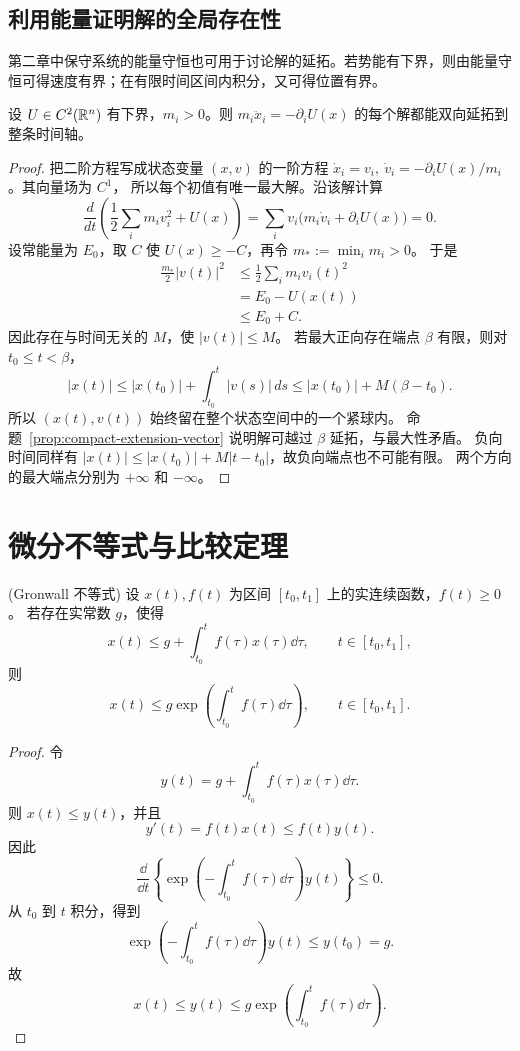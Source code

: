 \subsection*{利用能量证明解的全局存在性}
第二章中保守系统的能量守恒也可用于讨论解的延拓。若势能有下界，则由能量守恒可得速度有界；在有限时间区间内积分，又可得位置有界。
\begin{theorem}[能量与全局延拓]\label{thm:energy-global-extension}
设 $U\in C^2(\mathbb{R}^n)$ 有下界，$m_i>0$。则
$m_i\ddot x_i=-\partial_iU(x)$ 的每个解都能双向延拓到整条时间轴。
\end{theorem}
\begin{proof}
把二阶方程写成状态变量 $(x,v)$ 的一阶方程
$\dot x_i=v_i,\ \dot v_i=-\partial_iU(x)/m_i$。其向量场为 $C^1$，
所以每个初值有唯一最大解。沿该解计算
\[
 \frac{d}{dt}\left(\frac12\sum_i m_iv_i^2+U(x)\right)
 =\sum_i v_i\bigl(m_i\dot v_i+\partial_iU(x)\bigr)=0.
\]
设常能量为 $E_0$，取 $C$ 使 $U(x)\geq-C$，再令 $m_*:=\min_i m_i>0$。
于是
\[
 \begin{aligned}
 \frac{m_*}{2}|v(t)|^2&\leq\frac12\sum_i m_iv_i(t)^2\\
 &=E_0-U(x(t))\\
 &\leq E_0+C.
\end{aligned}
\]
因此存在与时间无关的 $M$，使 $|v(t)|\leq M$。
若最大正向存在端点 $\beta$ 有限，则对 $t_0\leq t<\beta$，
\[
 |x(t)|\leq |x(t_0)|+\int_{t_0}^t|v(s)|\,ds
 \leq |x(t_0)|+M(\beta-t_0).
\]
所以 $(x(t),v(t))$ 始终留在整个状态空间中的一个紧球内。
命题~\ref{prop:compact-extension-vector} 说明解可越过 $\beta$ 延拓，与最大性矛盾。
负向时间同样有
$|x(t)|\leq|x(t_0)|+M|t-t_0|$，故负向端点也不可能有限。
两个方向的最大端点分别为 $+\infty$ 和 $-\infty$。
\end{proof}

\section{微分不等式与比较定理}\label{sec:微分不等式与比较定理}

\begin{theorem}(Gronwall 不等式)\label{thm:Gronwall不等式}
	设 $x(t),f(t)$ 为区间 $[t_0,t_1]$ 上的实连续函数，$f(t)\geq0$。
	若存在实常数 $g$，使得
	\[
		x(t)\leq g+\int_{t_0}^{t}f(\tau)x(\tau)\dd\tau,
		\qquad t\in[t_0,t_1],
	\]
	则
	\[
		x(t)\leq g\exp\left(\int_{t_0}^{t}f(\tau)\dd\tau\right),
		\qquad t\in[t_0,t_1].
	\]
\end{theorem}

\begin{proof}
	令
	\[
		y(t)=g+\int_{t_0}^{t}f(\tau)x(\tau)\dd\tau.
	\]
	则 $x(t)\leq y(t)$，并且
	\[
		y'(t)=f(t)x(t)\leq f(t)y(t).
	\]
	因此
	\[
		\dfrac{\dd}{\dd t}
		\left\{
		\exp\left(-\int_{t_0}^{t}f(\tau)\dd\tau\right)y(t)
		\right\}\leq0.
	\]
	从 $t_0$ 到 $t$ 积分，得到
	\[
		\exp\left(-\int_{t_0}^{t}f(\tau)\dd\tau\right)y(t)
		\leq y(t_0)=g.
	\]
	故
	\[
		x(t)\leq y(t)
		\leq g\exp\left(\int_{t_0}^{t}f(\tau)\dd\tau\right).
	\]
\end{proof}

